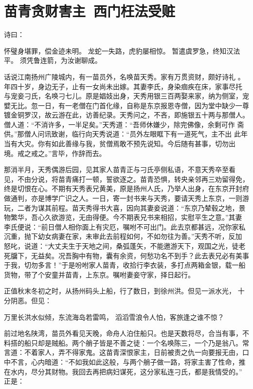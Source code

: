 \chapter{苗青贪财害主~西门枉法受赃}

诗曰：

怀璧身堪罪，偿金迹未明。
龙蛇一失路，虎豹屡相惊。
暂遣虞罗急，终知汉法平。
须凭鲁连箭，为汝谢聊成。

话说江南扬州广陵城内，有一苗员外，名唤苗天秀。家有万贯资财，颇好诗礼
。年四十岁，身边无子，止有一女尚未出嫁。其妻李氏，身染痼疾在床，家事尽托
与宠妾刁氏，名唤刁七儿。原是娼妓出身，天秀用银三百两娶来家，纳为侧室，宠
嬖无比。忽一日，有一老僧在门首化缘，自称是东京报恩寺僧，因为堂中缺少一尊
镀金铜罗汉，故云游在此，访善纪录。天秀问之，不吝，即施银五十两与那僧人。
僧人道：“不消许多，一半足矣。”天秀道：“吾师休嫌少，除完佛像，余剩可作
斋供。”那僧人问讯致谢，临行向天秀说道：“员外左眼眶下有一道死气，主不出
此年当有大灾。你有如此善缘与我，贫僧焉敢不预先说知。今后随有甚事，切勿出
境。戒之戒之。”言毕，作辞而去。

那消半月，天秀偶游后园，见其家人苗青正与刁氏亭侧私语，不意天秀卒至看
见，不由分说，将苗青痛打一顿，誓欲逐之。苗青恐惧，转央亲邻再三劝留得免，
终是切恨在心。不期有天秀表兄黄美，原是扬州人氏，乃举人出身，在东京开封府
做通判，亦是博学广识之人。一日，寄一封书来与天秀，要请天秀上东京，一则游
玩，二者为谋其前程。苗天秀得书大喜，因向其妻妾说道：“东京乃辇毂之地，景
物繁华，吾心久欲游览，无由得便。今不期表兄书来相招，实慰平生之意。”其妻
李氏便说：“前日僧人相你面上有灾厄，嘱咐不可出门。此去京都甚远，况你家私
沉重，抛下幼女病妻在家，未审此去前程如何，不如勿往为善。”天秀不听，反加
怒叱，说道：“大丈夫生于天地之间，桑弧蓬矢，不能邀游天下，观国之光，徒老
死牖下，无益矣。况吾胸中有物，囊有余资，何愁功名不到手？此去表兄必有美事
于我，切勿多言！”于是吩咐家人苗青，收拾行李衣装，多打点两箱金银，载一船
货物，带了个安童并苗青，上东京。嘱咐妻妾守家，择日起行。

正值秋末冬初之时，从扬州码头上船，行了数日，到徐州洪。但见一派水光，
十分阴恶。但见：

万里长洪水似倾，东流海岛若雷鸣，
滔滔雪浪令人怕，客旅逢之谁不惊？

前过地名陕湾，苗员外看见天晚，命舟人泊住船只。也是天数将尽，合当有事，不
料搭的船只却是贼船。两个艄子皆是不善之徒：一个名唤陈三，一个乃是翁八。常
言道：不着家人，弄不得家鬼。这苗青深恨家主，日前被责之仇一向要报无由，口
中不言，心内暗道：“不如我如此这般，与两个艄子做一路，将家主害了性命，推
在水内，尽分其财物。我回去再把病妇谋死，这分家私连刁氏，都是我情受的。”
正是：

